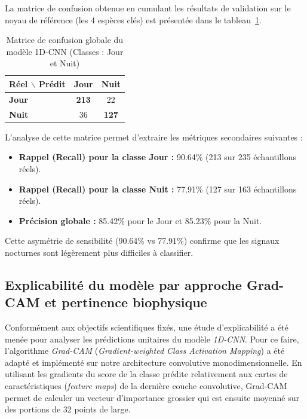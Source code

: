 \documentclass[12pt,a4paper,twoside]{article}
\begin{document}
La matrice de confusion obtenue en cumulant les résultats de validation sur le noyau de référence (les 4 espèces clés) est présentée dans le tableau~\ref{tab:confusion_matrix}.

\begin{table}[htbp]
\centering
\caption{Matrice de confusion globale du modèle 1D-CNN (Classes : Jour et Nuit)}
\label{tab:confusion_matrix}
\vspace{0.3cm}
\begin{tabular}{l|cc}
\toprule
\textbf{Réel $\backslash$ Prédit} & \textbf{Jour} & \textbf{Nuit} \\ 
\midrule
\textbf{Jour} & \textbf{213} & 22 \\
\textbf{Nuit} & 36 & \textbf{127} \\
\bottomrule
\end{tabular}
\end{table}

L'analyse de cette matrice permet d'extraire les métriques secondaires suivantes :
\begin{itemize}
    \item \textbf{Rappel (Recall) pour la classe Jour :} \num{90.64}\% (\num{213} sur \num{235} échantillons réels).
    \item \textbf{Rappel (Recall) pour la classe Nuit :} \num{77.91}\% (\num{127} sur \num{163} échantillons réels).
    \item \textbf{Précision globale :} \num{85.42}\% pour le Jour et \num{85.23}\% pour la Nuit.
\end{itemize}
Cette asymétrie de sensibilité (\num{90.64}\% vs \num{77.91}\%) confirme que les signaux nocturnes sont légèrement plus difficiles à classifier.


\subsection{Explicabilité du modèle par approche Grad-CAM et pertinence biophysique}
\label{subsec:explicabilite_resultats}

Conformément aux objectifs scientifiques fixés, une étude d'explicabilité a été menée pour analyser les prédictions unitaires du modèle \textit{1D-CNN}. Pour ce faire, l'algorithme \textit{Grad-CAM} (\textit{Gradient-weighted Class Activation Mapping}) a été adapté et implémenté sur notre architecture convolutive monodimensionnelle. En utilisant les gradients du score de la classe prédite relativement aux cartes de caractéristiques (\textit{feature maps}) de la dernière couche convolutive, Grad-CAM permet de calculer un vecteur d'importance grossier qui est ensuite moyenné sur des portions de 32 points de large.
\end{document}
